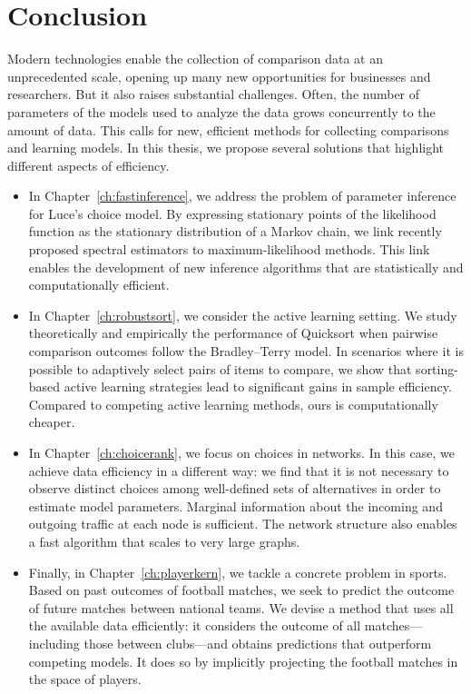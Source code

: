 \chapter{Conclusion}
\label{ch:conclusion}

Modern technologies enable the collection of comparison data at an unprecedented scale, opening up many new opportunities for businesses and researchers.
But it also raises substantial challenges.
Often, the number of parameters of the models used to analyze the data grows concurrently to the amount of data.
This calls for new, efficient methods for collecting comparisons and learning models.
In this thesis, we propose several solutions that highlight different aspects of efficiency.

\begin{itemize}
\item In Chapter~\ref{ch:fastinference}, we address the problem of parameter inference for Luce's choice model.
By expressing stationary points of the likelihood function as the stationary distribution of a Markov chain, we link recently proposed spectral estimators to maximum-likelihood methods.
This link enables the development of new inference algorithms that are statistically and computationally efficient.

\item In Chapter~\ref{ch:robustsort}, we consider the active learning setting.
We study theoretically and empirically the performance of Quicksort when pairwise comparison outcomes follow the Bradley--Terry model.
In scenarios where it is possible to adaptively select pairs of items to compare, we show that sorting-based active learning strategies lead to significant gains in sample efficiency.
Compared to competing active learning methods, ours is computationally cheaper.

\item In Chapter~\ref{ch:choicerank}, we focus on choices in networks.
In this case, we achieve data efficiency in a different way: we find that it is not necessary to observe distinct choices among well-defined sets of alternatives in order to estimate model parameters.
Marginal information about the incoming and outgoing traffic at each node is sufficient.
The network structure also enables a fast algorithm that scales to very large graphs.

\item Finally, in Chapter~\ref{ch:playerkern}, we tackle a concrete problem in sports.
Based on past outcomes of football matches, we seek to predict the outcome of future matches between national teams.
We devise a method that uses all the available data efficiently: it considers the outcome of all matches---including those between clubs---and obtains predictions that outperform competing models.
It does so by implicitly projecting the football matches in the space of players.
\end{itemize}

